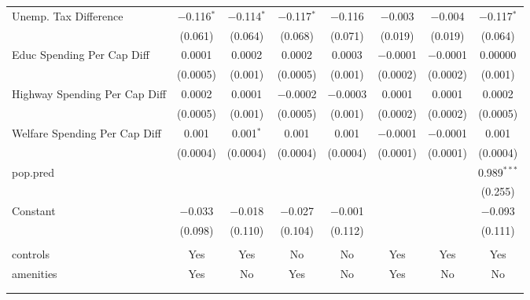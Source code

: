 \begin{table}[!htbp]
\begin{tabular}{@{\extracolsep{5pt}}lccccccc}
  Unemp. Tax Difference & $-$0.116$^{*}$ & $-$0.114$^{*}$ & $-$0.117$^{*}$ & $-$0.116 & $-$0.003 & $-$0.004 & $-$0.117$^{*}$ \\ 
  & (0.061) & (0.064) & (0.068) & (0.071) & (0.019) & (0.019) & (0.064) \\ 
  Educ Spending Per Cap Diff & 0.0001 & 0.0002 & 0.0002 & 0.0003 & $-$0.0001 & $-$0.0001 & 0.00000 \\ 
  & (0.0005) & (0.001) & (0.0005) & (0.001) & (0.0002) & (0.0002) & (0.001) \\ 
  Highway Spending Per Cap Diff & 0.0002 & 0.0001 & $-$0.0002 & $-$0.0003 & 0.0001 & 0.0001 & 0.0002 \\ 
  & (0.0005) & (0.001) & (0.0005) & (0.001) & (0.0002) & (0.0002) & (0.0005) \\ 
  Welfare Spending Per Cap Diff & 0.001 & 0.001$^{*}$ & 0.001 & 0.001 & $-$0.0001 & $-$0.0001 & 0.001 \\ 
  & (0.0004) & (0.0004) & (0.0004) & (0.0004) & (0.0001) & (0.0001) & (0.0004) \\ 
  pop.pred &  &  &  &  &  &  & 0.989$^{***}$ \\ 
  &  &  &  &  &  &  & (0.255) \\ 
  Constant & $-$0.033 & $-$0.018 & $-$0.027 & $-$0.001 &  &  & $-$0.093 \\ 
  & (0.098) & (0.110) & (0.104) & (0.112) &  &  & (0.111) \\ 
 \hline \\[-1.8ex] 
controls & Yes & Yes & No & No & Yes & Yes & Yes \\ 
amenities & Yes & No & Yes & No & Yes & No & No \\ 
\hline \\[-1.8ex] 
\hline 
\hline \\[-1.8ex] 
\end{tabular} 
\end{table} 
